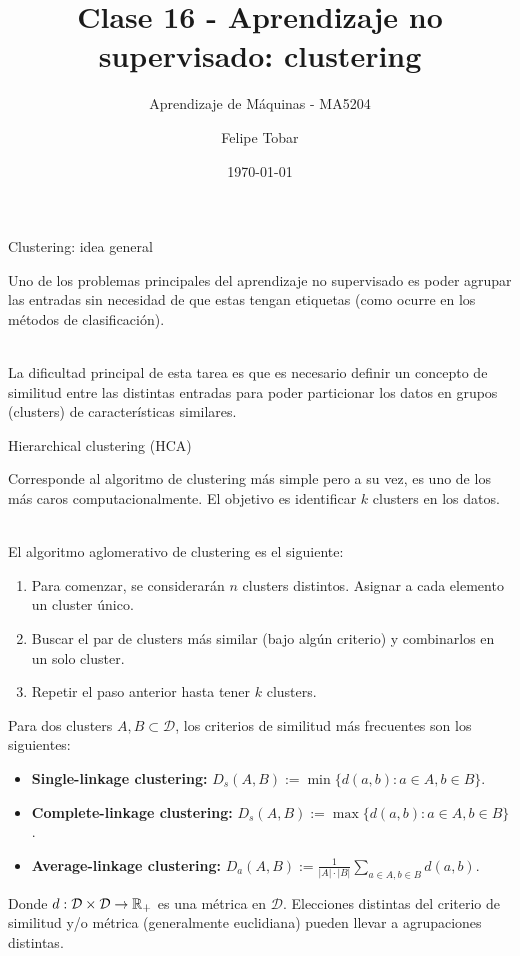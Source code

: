 \documentclass[9pt]{beamer}
\title{Clase 16 - Aprendizaje no supervisado: clustering}
\subtitle{Aprendizaje de Máquinas - MA5204}
\date{\today}
\author{Felipe Tobar}
\institute{Department of Mathematical Engineering \&\\ Center for Mathematical Modelling\\Universidad de Chile}
\begin{document}
\begin{frame}
  \titlepage
\end{frame}

\begin{frame}{Clustering: idea general}
	
	Uno de los problemas principales del aprendizaje no supervisado es poder agrupar las entradas sin necesidad de que estas tengan etiquetas (como ocurre en los métodos de clasificación).\\~\
	
	\pause
	La dificultad principal de esta tarea es que es necesario definir un concepto de similitud entre las distintas entradas para poder particionar los datos en grupos (clusters) de características similares.
	
\end{frame}

\begin{frame}{Hierarchical clustering (HCA)}
	
	Corresponde al algoritmo de clustering más simple pero a su vez, es uno de los más caros computacionalmente. El objetivo es identificar $k$ clusters en los datos. \\~\ \pause

 El algoritmo aglomerativo de clustering es el siguiente:

\begin{enumerate}
	\item Para comenzar, se considerarán $n$ clusters distintos. Asignar a cada elemento un cluster único.\pause
	\item Buscar el par de clusters más similar (bajo algún criterio) y combinarlos en un solo cluster.\pause
	\item Repetir el paso anterior hasta tener $k$ clusters.
\end{enumerate}
\pause
Para dos clusters $A,B\subset\mathcal{D}$, los criterios de similitud más frecuentes son los siguientes:

\begin{itemize}
	\item \textbf{Single-linkage clustering:} $D_s(A,B):=\min\{d(a,b):a\in A, b\in B\}$.\pause
	\item \textbf{Complete-linkage clustering:} $D_s(A,B):=\max\{d(a,b):a\in A, b\in B\}$.\pause
	\item \textbf{Average-linkage clustering:} $D_a(A,B):=\frac{1}{|A|\cdot|B|}\sum_{a\in A, b\in B} d(a,b)$.\pause
\end{itemize}

Donde $d:\mathcal{D}\times \mathcal{D}\to \mathbb{R}_+$ es una métrica en $\mathcal{D}$. Elecciones distintas del criterio de similitud y/o métrica (generalmente euclidiana) pueden llevar a agrupaciones distintas.
	
	
\end{frame}
\end{document}
